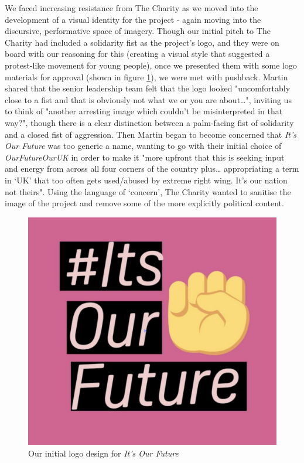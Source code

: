 We faced increasing resistance from The Charity as we moved into the development of a visual identity for the project - again moving into the discursive, performative space of imagery. Though our initial pitch to The Charity had included a solidarity fist as the project's logo, and they were on board with our reasoning for this (creating a visual style that suggested a protest-like movement for young people), once we presented them with some logo materials for approval (shown in figure \ref{fig:iof-logo-1}), we were met with pushback. Martin shared that the senior leadership team felt that the logo looked "uncomfortably close to a fist and that is obviously not what we or you are about…", inviting us to think of "another arresting image which couldn’t be misinterpreted in that way?", though there is a clear distinction between a palm-facing fist of solidarity and a closed fist of aggression. Then Martin began to become concerned that \textit{It’s Our Future }was too generic a name, wanting to go with their initial choice of \textit{OurFutureOurUK} in order to make it "more upfront that this is seeking input and energy from across all four corners of the country plus… appropriating a term in ‘UK’ that too often gets used/abused by extreme right wing. It’s our nation not theirs". Using the language of `concern', The Charity wanted to sanitise the image of the project and remove some of the more explicitly political content.

\begin{figure}[hbt!]
    \centering
    \includegraphics[width=0.25\linewidth]{Images/7/iof-logo-1.png}
    \caption{Our initial logo design for \textit{It's Our Future}}
    \label{fig:iof-logo-1}
\end{figure}

